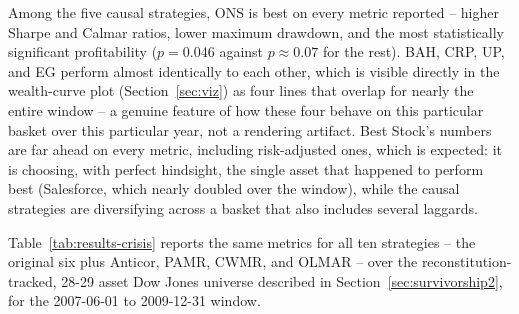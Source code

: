 \documentclass[11pt]{article}
\begin{document}
Among the five causal strategies, ONS is best on every metric reported --
higher Sharpe and Calmar ratios, lower maximum drawdown, and the most
statistically significant profitability ($p = 0.046$ against $p \approx
0.07$ for the rest). BAH, CRP, UP, and EG perform almost identically to
each other, which is visible directly in the wealth-curve plot
(Section~\ref{sec:viz}) as four lines that overlap for nearly the
entire window -- a genuine feature of how these four behave on this
particular basket over this particular year, not a rendering artifact.
Best Stock's numbers are far ahead on every metric, including
risk-adjusted ones, which is expected: it is choosing, with perfect
hindsight, the single asset that happened to perform best (Salesforce,
which nearly doubled over the window), while the causal strategies are
diversifying across a basket that also includes several laggards.

Table~\ref{tab:results-crisis} reports the same metrics for all ten
strategies -- the original six plus Anticor, PAMR, CWMR, and OLMAR --
over the reconstitution-tracked, 28-29 asset Dow Jones universe
described in Section~\ref{sec:survivorship2}, for the 2007-06-01 to
2009-12-31 window.
\end{document}
